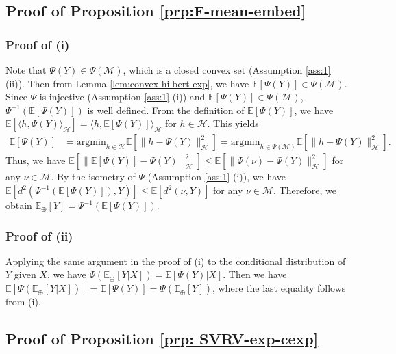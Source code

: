 \documentclass[11pt,reqno]{amsart}
\begin{document}
\subsection{Proof of Proposition \ref{prp:F-mean-embed}}

\subsubsection{Proof of (i)}

Note that $\Psi(Y) \in \Psi(\mathcal{M})$, which is a closed convex set (Assumption \ref{ass:1} (ii)). Then from Lemma \ref{lem:convex-hilbert-exp}, we have $\mathbb{E}[\Psi(Y)] \in \Psi(\mathcal{M})$. Since $\Psi$ is injective (Assumption \ref{ass:1} (i)) and $\mathbb{E}[\Psi(Y)] \in \Psi(\mathcal{M})$, $\Psi^{-1}(\mathbb{E}[\Psi(Y)])$ is well defined. From the definition of $\mathbb{E}[\Psi(Y)]$, we have $\mathbb{E}[\langle h, \Psi(Y) \rangle_\mathcal{H}] = \langle h, \mathbb{E}[\Psi(Y)] \rangle_\mathcal{H}$ for $h \in \mathcal{H}$. This yields 
\begin{align*}
\mathbb{E}[\Psi(Y)] 
&= \mathrm{argmin}_{h \in \mathcal{H}}\mathbb{E}[\|h - \Psi(Y)\|_\mathcal{H}^2]
= \mathrm{argmin}_{h \in \Psi(\mathcal{M})}\mathbb{E}[\|h - \Psi(Y)\|_\mathcal{H}^2]. 
\end{align*}
Thus, we have $\mathbb{E}[\|\mathbb{E}[\Psi(Y)] - \Psi(Y)\|_\mathcal{H}^2] 
\leq \mathbb{E}[\|\Psi(\nu) - \Psi(Y)\|_\mathcal{H}^2]$ for any $\nu \in \mathcal{M}$. By the isometry of $\Psi$ (Assumption \ref{ass:1} (i)), we have $\mathbb{E}\left[d^2\left(\Psi^{-1}(\mathbb{E}[\Psi(Y)]), Y\right)\right] \leq \mathbb{E}[d^2(\nu,Y)]$ for any $\nu \in \mathcal{M}$. Therefore, we obtain $\mathbb{E}_\oplus[Y] = \Psi^{-1}(\mathbb{E}[\Psi(Y)])$. 

\subsubsection{Proof of (ii)}

Applying the same argument in the proof of (i) to the conditional distribution of $Y$ given $X$, we have $\Psi(\mathbb{E}_\oplus[Y|X]) = \mathbb{E}[\Psi(Y)|X]$. Then we have $\mathbb{E}[\Psi(\mathbb{E}_\oplus[Y|X])] = \mathbb{E}[\Psi(Y)] = \Psi(\mathbb{E}_\oplus[Y])$, where the last equality follows from (i). 

\subsection{Proof of Proposition \ref{prp: SVRV-exp-cexp}}
\end{document}
